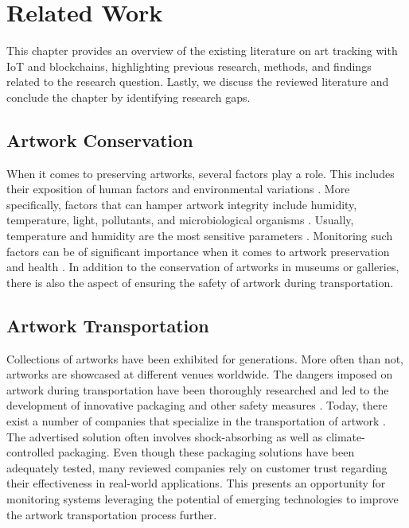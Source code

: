 \chapter{Related Work}
\label{chap:related_work}
This chapter provides an overview of the existing literature on art tracking with IoT and blockchains, highlighting previous research, methods, and findings related to the research question. Lastly, we discuss the reviewed literature and conclude the chapter by identifying research gaps.

\section{Artwork Conservation}
When it comes to preserving artworks, several factors play a role. This includes their exposition of human factors and environmental variations \cite{woodenartworkmonitoring}. More specifically, factors that can hamper artwork integrity include humidity, temperature, light, pollutants, and microbiological organisms \cite{riskassessment}. Usually, temperature and humidity are the most sensitive parameters \cite{riskassessment}. Monitoring such factors can be of significant importance when it comes to artwork preservation and health \cite{environmentmonitoring}. In addition to the conservation of artworks in museums or galleries, there is also the aspect of ensuring the safety of artwork during transportation. 

\section{Artwork Transportation}
Collections of artworks have been exhibited for generations. More often than not, artworks are showcased at different venues worldwide. The dangers imposed on artwork during transportation have been thoroughly researched and led to the development of innovative packaging and other safety measures \cite{artintransit}. Today, there exist a number of companies that specialize in the transportation of artwork \cite{kraftels, hasenkamp, weltifurrer}. The advertised solution often involves shock-absorbing as well as climate-controlled packaging. Even though these packaging solutions have been adequately tested, many reviewed companies rely on customer trust regarding their effectiveness in real-world applications. This presents an opportunity for monitoring systems leveraging the potential of emerging technologies to improve the artwork transportation process further.

